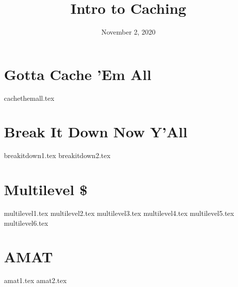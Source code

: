 \documentclass[11pt]{exam}
\title{Intro to Caching}
\date{November 2, 2020}
\begin{document}
\maketitle

\section{Gotta Cache 'Em All}
\begin{questions}
{cachethemall.tex}
\end{questions}
\newpage

\section{Break It Down Now Y'All}
\begin{questions}
{breakitdown1.tex}
{breakitdown2.tex}
\end{questions}
\newpage

\section{Multilevel \$}
\begin{questions}
{multilevel1.tex}
{multilevel2.tex}
{multilevel3.tex}
{multilevel4.tex}
{multilevel5.tex}
{multilevel6.tex}
\end{questions}
\newpage

\section{AMAT}
\begin{questions}
{amat1.tex}
{amat2.tex}
\end{questions}
\newpage
\end{document}
